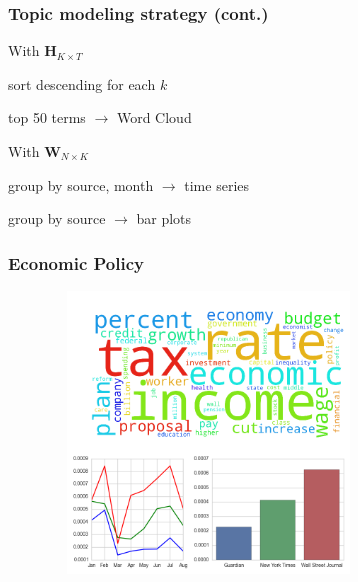 \documentclass[11pt]{beamer}
\newenvironment{innerlist}[1][\enskip\textbullet]%
        {\begin{compactenum}[#1]}{\end{compactenum}}
\begin{document}

\begin{frame}
\frametitle{Topic modeling strategy (cont.)}


\vspace{5mm}

\begin{itemize}
	\item With $\mathbf{H}_{K \times T}$
	\vspace{2mm}
	\begin{innerlist}
		\item sort descending for each $k$ 
		\item top 50 terms $\rightarrow$ Word Cloud
	\end{innerlist}
	\vspace{6mm}
	\item With $\mathbf{W}_{N \times K}$
	\vspace{2mm}
	\begin{innerlist}
		\item group by source, month $\rightarrow$ time series
		\item group by source  $\rightarrow$ bar plots
	\end{innerlist}
\end{itemize}


\end{frame}



\begin{frame}
\frametitle{Economic Policy}

\begin{figure}
\centering
\includegraphics[width=85mm,height=75mm]{figures/source_topic0.png}
\end{figure} 

\end{frame}
\end{document}

